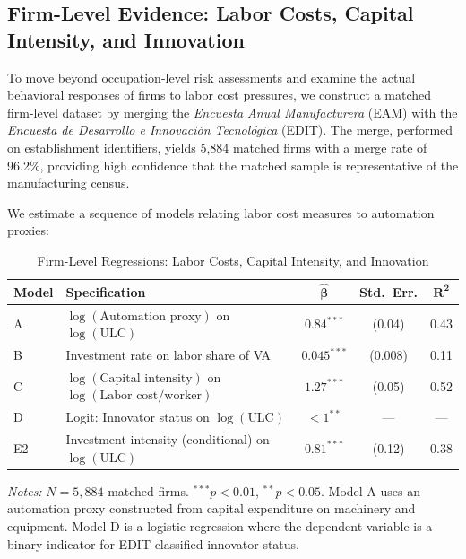 \documentclass{article}
\begin{document}
\subsection{Firm-Level Evidence: Labor Costs, Capital Intensity, and Innovation}
\label{subsec:firm_results}

To move beyond occupation-level risk assessments and examine the actual behavioral responses of firms to labor cost pressures, we construct a matched firm-level dataset by merging the \textit{Encuesta Anual Manufacturera} (EAM) with the \textit{Encuesta de Desarrollo e Innovaci\'on Tecnol\'ogica} (EDIT). The merge, performed on establishment identifiers, yields 5,884 matched firms with a merge rate of 96.2\%, providing high confidence that the matched sample is representative of the manufacturing census.

We estimate a sequence of models relating labor cost measures to automation proxies:

\begin{table}[H]
\centering
\caption{Firm-Level Regressions: Labor Costs, Capital Intensity, and Innovation}
\label{tab:firm_results}
\begin{threeparttable}
\begin{tabular}{llccc}
\toprule
\textbf{Model} & \textbf{Specification} & $\boldsymbol{\hat{\beta}}$ & \textbf{Std.\ Err.} & $\boldsymbol{R^2}$ \\
\midrule
A & $\log(\text{Automation proxy})$ on $\log(\text{ULC})$ & $0.84^{***}$ & (0.04) & 0.43 \\
B & Investment rate on labor share of VA & $0.045^{***}$ & (0.008) & 0.11 \\
C & $\log(\text{Capital intensity})$ on $\log(\text{Labor cost/worker})$ & $1.27^{***}$ & (0.05) & 0.52 \\
\midrule
D & Logit: Innovator status on $\log(\text{ULC})$ & $<1^{**}$ & --- & --- \\
E2 & Investment intensity (conditional) on $\log(\text{ULC})$ & $0.81^{***}$ & (0.12) & 0.38 \\
\bottomrule
\end{tabular}
\begin{tablenotes}
\small
\item \textit{Notes:} $N = 5{,}884$ matched firms. $^{***}p<0.01$, $^{**}p<0.05$. Model A uses an automation proxy constructed from capital expenditure on machinery and equipment. Model D is a logistic regression where the dependent variable is a binary indicator for EDIT-classified innovator status.
\end{tablenotes}
\end{threeparttable}
\end{table}
\end{document}
